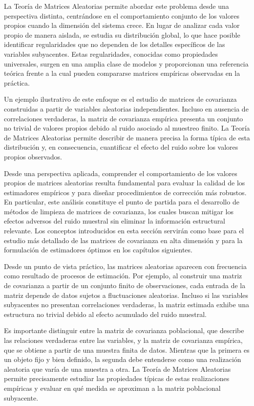 \documentclass[letterpaper,12pt,oneside]{book}
\begin{document}
La Teoría de Matrices Aleatorias permite abordar este problema desde una perspectiva distinta, centrándose en el comportamiento conjunto de los valores propios cuando la dimensión del sistema crece. En lugar de analizar cada valor propio de manera aislada, se estudia su distribución global,
lo que hace posible identificar regularidades que no dependen de los detalles específicos de las variables subyacentes. Estas regularidades, conocidas como propiedades universales, surgen en una amplia clase de modelos y proporcionan una referencia teórica frente a la cual pueden compararse matrices empíricas observadas en la práctica.

Un ejemplo ilustrativo de este enfoque es el estudio de matrices de covarianza construidas a partir de variables aleatorias independientes. Incluso en ausencia de correlaciones verdaderas, la matriz de covarianza empírica presenta un conjunto no trivial de valores propios debido al ruido asociado al muestreo finito. La Teoría de Matrices Aleatorias permite describir de manera precisa la forma típica de esta distribución y, en consecuencia, cuantificar el efecto del ruido sobre los valores
propios observados.

Desde una perspectiva aplicada, comprender el comportamiento de los valores propios de matrices aleatorias resulta fundamental para evaluar la calidad de los estimadores empíricos y para diseñar procedimientos de corrección más robustos. En particular, este análisis constituye el punto de partida para el desarrollo de métodos de limpieza de matrices de covarianza, los cuales buscan mitigar los efectos adversos del ruido muestral sin eliminar la información estructural relevante. Los conceptos introducidos en esta sección servirán como base para el estudio más detallado de las matrices de covarianza en alta dimensión y para la formulación de estimadores óptimos en los capítulos siguientes.

Desde un punto de vista práctico, las matrices aleatorias aparecen con frecuencia como resultado de procesos de estimación. Por ejemplo, al construir una matriz de covarianza a partir de un conjunto finito de observaciones, cada entrada de la matriz depende de datos sujetos a fluctuaciones aleatorias. Incluso si las variables subyacentes no presentan correlaciones verdaderas, la matriz
estimada exhibe una estructura no trivial debido al efecto acumulado del ruido muestral.

Es importante distinguir entre la matriz de covarianza poblacional, que describe las relaciones verdaderas entre las variables, y la matriz de covarianza empírica, que se obtiene a partir de una muestra finita de datos. Mientras que la primera es un objeto fijo y bien definido, la segunda debe entenderse como una realización aleatoria que varía de una muestra a otra. La Teoría de Matrices Aleatorias permite precisamente estudiar las propiedades típicas de estas realizaciones empíricas y evaluar en qué medida se aproximan a la matriz poblacional subyacente.
\end{document}
